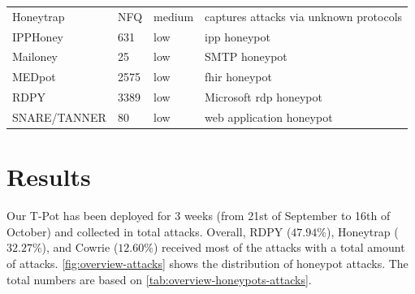 \begin{table}
\begin{tabularx}{\linewidth}{l|XlX}
        Honeytrap \cite{honeytrap2021}            & NFQ                                                                                                         & medium                     & captures attacks via unknown protocols                                               \\
        IPPHoney \cite{ipphoney2021}              & 631                                                                                                         & low                        & \ac{ipp} honeypot                                                                    \\
        Mailoney \cite{mailoney2021}              & 25                                                                                                          & low                        & SMTP honeypot                                                                        \\
        MEDpot \cite{medpot2021}                  & 2575                                                                                                        & low                        & \ac{fhir} honeypot                                                                   \\
        RDPY \cite{rdpy2021}                      & 3389                                                                                                        & low                        & Microsoft \ac{rdp} honeypot                                                          \\
        SNARE/TANNER \cite{snare2021}             & 80                                                                                                          & low                        & web application honeypot                                                             \\
        \bottomrule
    \end{tabularx}
    \label{tab:overview-honeypots}
\end{table}

\section{Results}%
\label{sec:honeypots-heicloud}

Our T-Pot has been deployed for 3 weeks (from 21st of September to 16th of October) and collected in total  attacks.
Overall, RDPY ($47.94\%$), Honeytrap ($32.27\%$), and Cowrie ($12.60\%$) received most of the attacks with a total amount of  attacks.
\autoref{fig:overview-attacks} shows the distribution of honeypot attacks.
The total numbers are based on \autoref{tab:overview-honeypots-attacks}.

